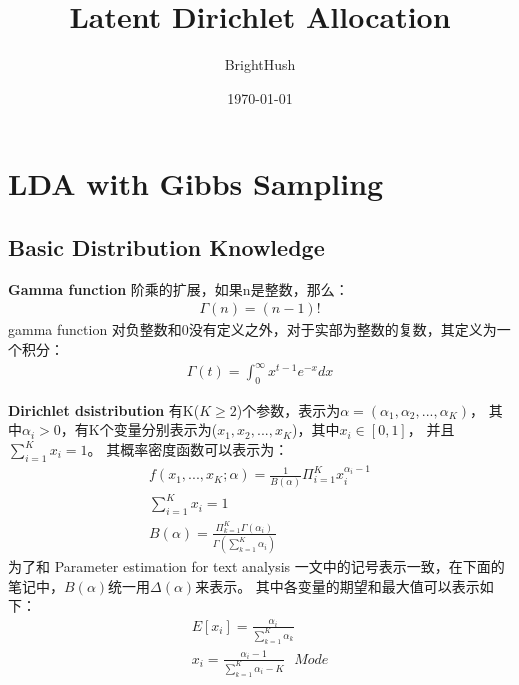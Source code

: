 \documentclass[UTF8]{ctexart}
\title{Latent Dirichlet Allocation}
\author{BrightHush}
\date{\today}
\begin{document}
\maketitle
\tableofcontents

\pagestyle{fancy}
\cfoot{\thepage}

\newcommand{\figref}[1]{\figurename~\ref{#1}}

\section{LDA with Gibbs Sampling}

\subsection{Basic Distribution Knowledge}
\textbf{Gamma function} 阶乘的扩展，如果n是整数，那么：
\begin{align}
\Gamma(n) = (n-1)!
\end{align}
gamma function 对负整数和0没有定义之外，对于实部为整数的复数，其定义为一个积分：
\begin{align}
\Gamma(t) = \int_{0}^{\infty}x^{t-1}e^{-x}dx
\end{align}
\par
\textbf{Dirichlet dsistribution} 有K($K \geq 2$)个参数，表示为$\alpha = (\alpha_1, \alpha_2, ..., \alpha_K)$，
其中$\alpha_i > 0$，有K个变量分别表示为($x_1, x_2, ..., x_K$)，其中$x_i \in \left[0, 1 \right]$，
并且$\sum_{i=1}^K x_i = 1$。
其概率密度函数可以表示为：
\begin{align}
f(x_1, ..., x_K; \alpha) = \frac{1}{B(\alpha)} \Pi_{i=1}^K x_{i}^{\alpha_i - 1}
\\
\sum_{i=1}^K x_i = 1
\\
B(\alpha) = \frac{\Pi_{k=1}^K \Gamma(\alpha_i)}{\Gamma(\sum_{k=1}^K \alpha_i)}
\end{align}
为了和 Parameter estimation for text analysis 一文中的记号表示一致，在下面的笔记中，$B(\alpha)$统一用$\Delta(\alpha)$来表示。
其中各变量的期望和最大值可以表示如下：
\begin{align}
E\left[ x_i \right] = \frac{\alpha_i}{\sum_{k=1}^K \alpha_k}
\\
x_i = \frac{\alpha_i - 1}{\sum_{k=1}^K \alpha_i - K} \ \ \ Mode
\end{align}
\end{document}
